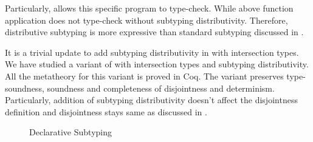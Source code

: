 \noindent Particularly,  allows this specific program to type-check.
While above function application does not type-check without
subtyping distributivity.
Therefore, distributive subtyping is more expressive than standard subtyping
discussed in .

It is a trivial update to add subtyping distributivity in \cal with
intersection types.
We have studied a variant of \name with intersection types and subtyping distributivity.
All the metatheory for this variant is proved in Coq. The variant preserves
type-soundness, soundness and completeness of disjointness and determinism.
Particularly, addition of subtyping distributivity
doesn't affect the disjointness definition and disjointness stays same as
discussed in .

\begin{figure}[t]
  \caption{Declarative Subtyping}
  \label{fig:discussion:ds}
\end{figure}